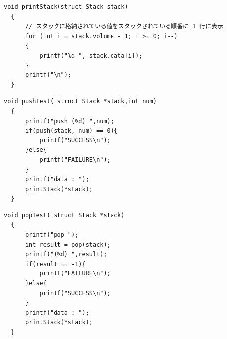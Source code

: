 \documentclass[dvipdfmx]{jsarticle}
\begin{document}
\begin{lstlisting}[caption={printStack関数}, label={lst:printstack}]
  void printStack(struct Stack stack)
  {
      // スタックに格納されている値をスタックされている順番に 1 行に表示
      for (int i = stack.volume - 1; i >= 0; i--)
      {
          printf("%d ", stack.data[i]);
      }
      printf("\n");
  }
\end{lstlisting}
\begin{lstlisting}[caption={pushTest関数}, label={lst:pushtest}]
  void pushTest( struct Stack *stack,int num)
  {
      printf("push (%d) ",num);
      if(push(stack, num) == 0){
          printf("SUCCESS\n");
      }else{
          printf("FAILURE\n");
      }
      printf("data : ");
      printStack(*stack);
  }
\end{lstlisting}
\begin{lstlisting}[caption={popTest関数}, label={lst:poptest}]
  void popTest( struct Stack *stack)
  {
      printf("pop ");
      int result = pop(stack);
      printf("(%d) ",result);
      if(result == -1){
          printf("FAILURE\n");
      }else{
          printf("SUCCESS\n");
      }
      printf("data : ");
      printStack(*stack);
  }
\end{lstlisting}
\end{document}
